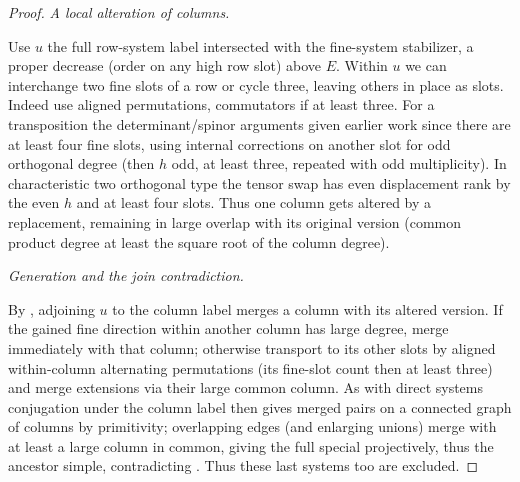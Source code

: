 \begin{proof}
\noindent\emph{A local alteration of columns.}

Use \(u\) the full row-system label intersected with the fine-system stabilizer, a proper decrease (order on any high row slot) above \(E\). Within \(u\) we can interchange two fine slots of a row or cycle three, leaving others in place as slots. Indeed use aligned permutations, commutators if at least three. For a transposition the determinant/spinor arguments given earlier work since there are at least four fine slots, using internal corrections on another slot for odd orthogonal degree (then \(h\) odd, at least three, repeated with odd multiplicity). In characteristic two orthogonal type the tensor swap has even displacement rank by the even \(h\) and at least four slots. Thus one column gets altered by a replacement, remaining in large overlap with its original version (common product degree at least the square root of the column degree).

\noindent\emph{Generation and the join contradiction.}

By , adjoining \(u\) to the column label merges a column with its altered version. If the gained fine direction within another column has large degree, merge immediately with that column; otherwise transport to its other slots by aligned within-column alternating permutations (its fine-slot count then at least three) and merge extensions via their large common column. As with direct systems conjugation under the column label then gives merged pairs on a connected graph of columns by primitivity; overlapping edges (and enlarging unions) merge with at least a large column in common, giving the full special projectively, thus the ancestor simple, contradicting . Thus these last systems too are excluded.

\end{proof}

